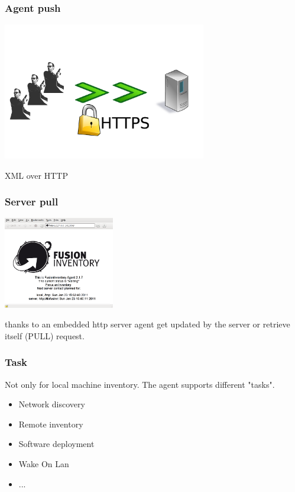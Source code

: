 \begin{frame}
    \frametitle{Agent push}

    \includegraphics[height=6.0cm]{pics/https.pdf}

    XML over HTTP

\end{frame}

\begin{frame}
    \frametitle{Server pull}
    \includegraphics[height=4.0cm]{pics/http-server.png}

    thanks to an embedded http server agent get updated by the server or retrieve itself (PULL) request.
\end{frame}

\begin{frame}
    \frametitle{Task}
    Not only for local machine inventory. The agent supports different "tasks".

    \pause
    \begin{itemize}

        \item Network discovery
        \item Remote inventory
        \item Software deployment
        \item Wake On Lan
        \item ...
    \end{itemize}
\end{frame}


